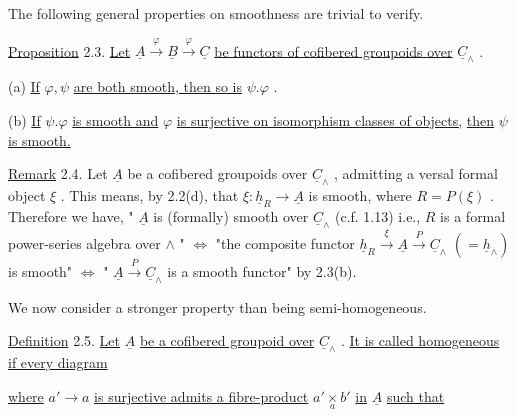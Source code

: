 The following general properties on smoothness are trivial to verify.

\underline{Proposition} 2.3.  \underline{Let}  $\underline{A} \xrightarrow{\ \varphi\ } \underline{B} \xrightarrow{\ \varphi\ } \underline{C}$  \underline{be functors of cofibered groupoids over}  $\underline{C}_\wedge$ .

(a)  \underline{If}  $\varphi, \psi$  \underline{are both smooth, then so is}  $\psi.\varphi$ .

(b)  \underline{If}  $\psi.\varphi$  \underline{is smooth and}  $\varphi$  \underline{is surjective on isomorphism classes of objects,}
\underline{then}  $\psi$  \underline{is smooth.}

\underline{Remark} 2.4.  Let  $\underline{A}$  be a cofibered groupoids over  $\underline{C}_\wedge$ , admitting a versal formal object  $\xi$ . This means, by 2.2(d), that  $\xi : \underline{h}_R \to \underline{A}$  is smooth, where  $R = P(\xi)$ . Therefore we have,  " $\underline{A}$  is (formally) smooth over  $\underline{C}_\wedge$  (c.f. 1.13) i.e.,  $R$  is a formal power-series algebra over  $\wedge$ "  $\Leftrightarrow$  "the composite functor  $\underline{h}_R \xrightarrow{\ \xi\ } \underline{A} \xrightarrow{\ P\ } \underline{C}_\wedge$   $(= \underline{h}_\wedge)$   is smooth"  $\Leftrightarrow$  " $\underline{A} \xrightarrow{\ P\ } \underline{C}_\wedge$  is a smooth functor"  by 2.3(b).

We now consider a stronger property than being semi-homogeneous.

\underline{Definition} 2.5.  \underline{Let}  $\underline{A}$  \underline{be a cofibered groupoid over}  $\underline{C}_\wedge$ . \underline{It is called homogeneous if every diagram}

\begin{center}
\end{center}
\underline{where}  $a' \to a$  \underline{is surjective admits a fibre-product}  $a' \underset{a}{\times} b'$  \underline{in}  $\underline{A}$  \underline{such that}

